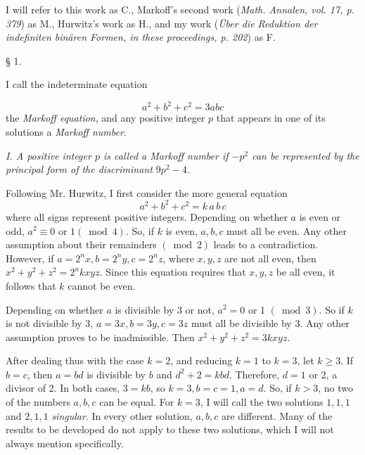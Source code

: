 \documentclass[12pt]{article}
\begin{document}
I will refer to this work as C., Markoff's second work (\textit{Math. Annalen, vol. 17, p. 379}) as M., Hurwitz's work as H., and my work (\textit{Über die Reduktion der indefiniten binären Formen, in these proceedings, p. 202}) as F.

\bigskip

\centerline{§ 1.}

\bigskip

I call the indeterminate equation

\begin{equation*}
a^{2}+b^{2}+c^{2}=3 a b c \tag{1.}
\end{equation*}
the \textit{Markoff equation}, and any positive integer $p$ that appears in one of its solutions a \textit{Markoff number}.

\bigskip

\textit{I. A positive integer $p$ is called a Markoff number if $-p^{2}$ can be represented by the principal form of the discriminant $9 p^{2}-4$.}

\bigskip

Following Mr. Hurwitz, I first consider the more general equation
\begin{equation*}
a^{2}+b^{2}+c^{2}=k \,a\, b\, c \tag{2.}
\end{equation*}
where all signs represent positive integers.
Depending on whether $a$ is even or odd, $a^{2} \equiv 0$ or $1(\bmod 4)$. So, if $k$ is even, $a, b, c$ must all be even. Any other assumption about their remainders $(\bmod 2)$ leads to a contradiction. However, if $a=2^{n} x, b=2^{n} y, c=2^{n} z$, where $x, y, z$ are not all even, then $x^{2}+y^{2}+z^{2}=2^{n} k x y z$. Since this equation requires that $x, y, z$ be all even, it follows that $k$ cannot be even.

Depending on whether $a$ is divisible by 3 or not, $a^{2}=0$ or 1 $(\bmod 3)$. So if $k$ is not divisible by 3, $a=3 x, b=3 y, c=3 z$ must all be divisible by 3. Any other assumption proves to be inadmissible. Then $x^{2}+y^{2}+z^{2}=3 k x y z$.

After dealing thus with the case $k=2$, and reducing $k=1$ to $k=3$, let $k \geq 3$. If $b=c$, then $a=b d$ is divisible by $b$ and $d^{2}+2=k b d$. Therefore, $d=1$ or 2, a divisor of 2. In both cases, $3=k b$, so $k=3, b=c=1, a=d$. So, if $k>3$, no two of the numbers $a, b, c$ can be equal. For $k=3$, I will call the two solutions $1,1,1$ and $2,1,1$ \textit{singular}. In every other solution, $a, b, c$ are different. Many of the results to be developed do not apply to these two solutions, which I will not always mention specifically.
\end{document}
